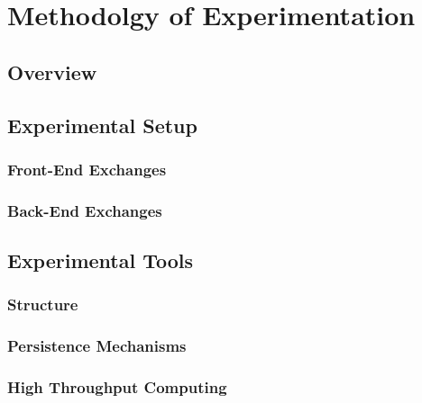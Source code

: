 \chapter{Methodolgy of Experimentation}\label{ch:method}

\section{Overview}

\section{Experimental Setup}

\subsection{Front-End Exchanges}

\subsection{Back-End Exchanges}

\section{Experimental Tools}

\subsection{Structure}

\subsection{Persistence Mechanisms}

\subsection{High Throughput Computing}
